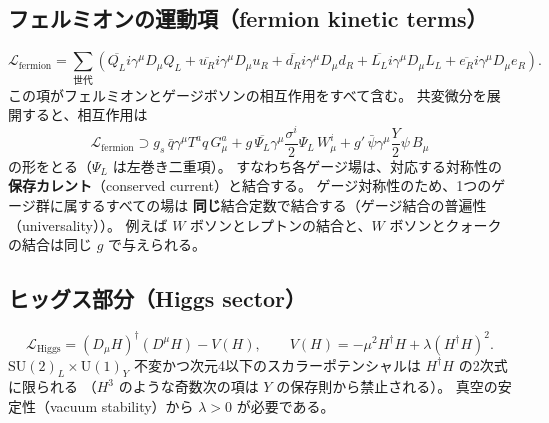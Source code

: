 \documentclass[uplatex,dvipdfmx,a4paper,11pt,openany]{jsbook}
\newcommand{\term}[2]{\textbf{#1}（#2）}
\newcommand{\en}[1]{（#1）}
\numberwithin{equation}{chapter}
\theoremstyle{definition}
\theoremstyle{plain}
\theoremstyle{remark}
\newcommand{\Lag}{\mathcal{L}}
\newcommand{\SU}{\mathrm{SU}}
\newcommand{\U}{\mathrm{U}}
\begin{document}
\subsection{フェルミオンの運動項（fermion kinetic terms）}
\begin{equation}
\Lag_{\mathrm{fermion}}
=
\sum_{\text{世代}}
\left(
\overline{Q_L}i\gamma^\mu D_\mu Q_L
+\overline{u_R}i\gamma^\mu D_\mu u_R
+\overline{d_R}i\gamma^\mu D_\mu d_R
+\overline{L_L}i\gamma^\mu D_\mu L_L
+\overline{e_R}i\gamma^\mu D_\mu e_R
\right).
\end{equation}
この項がフェルミオンとゲージボソンの相互作用をすべて含む。
共変微分を展開すると、相互作用は
\begin{equation}
\Lag_{\mathrm{fermion}}\supset
g_s\,\bar q\gamma^\mu T^aq\,G_\mu^a
+g\,\overline{\Psi_L}\gamma^\mu\frac{\sigma^i}{2}\Psi_L\,W_\mu^i
+g'\,\bar\psi\gamma^\mu\frac{Y}{2}\psi\,B_\mu
\end{equation}
の形をとる（$\Psi_L$ は左巻き二重項）。
すなわち各ゲージ場は、対応する対称性の\term{保存カレント}{conserved current}と結合する。
ゲージ対称性のため、1つのゲージ群に属するすべての場は
\textbf{同じ}結合定数で結合する（ゲージ結合の普遍性\en{universality}）。
例えば $W$ ボソンとレプトンの結合と、$W$ ボソンとクォークの結合は同じ $g$ で与えられる。
\subsection{ヒッグス部分（Higgs sector）}
\begin{equation}
\Lag_{\mathrm{Higgs}}
=
(D_\mu H)^\dagger(D^\mu H)-V(H),
\qquad
V(H)=-\mu^2H^\dagger H+\lambda(H^\dagger H)^2 .
\end{equation}
$\SU(2)_L\times\U(1)_Y$ 不変かつ次元4以下のスカラーポテンシャルは $H^\dagger H$ の2次式に限られる
（$H^3$ のような奇数次の項は $Y$ の保存則から禁止される）。
真空の安定性\en{vacuum stability}から $\lambda>0$ が必要である。
\end{document}
